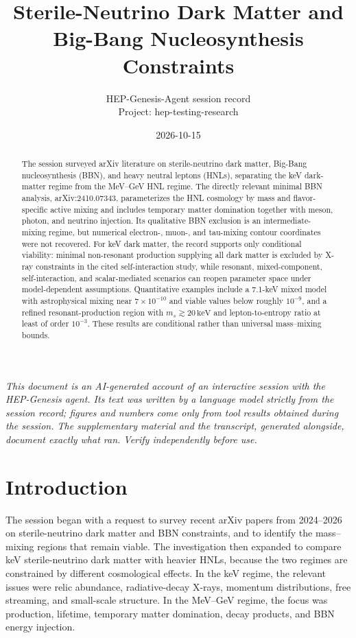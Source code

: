 \documentclass[11pt,a4paper]{article}
\title{Sterile-Neutrino Dark Matter and Big-Bang Nucleosynthesis Constraints}
\author{HEP-Genesis-Agent session record \\ \small Project: hep-testing-research}
\date{2026-10-15}
\begin{document}
\maketitle
\noindent\textit{\small This document is an AI-generated account of an interactive session with the HEP-Genesis agent. Its text was written by a language model strictly from the session record; figures and numbers come only from tool results obtained during the session. The supplementary material and the transcript, generated alongside, document exactly what ran. Verify independently before use.}
\vspace{1em}

\begin{abstract}
The session surveyed arXiv literature on sterile-neutrino dark matter, Big-Bang nucleosynthesis (BBN), and heavy neutral leptons (HNLs), separating the keV dark-matter regime from the MeV--GeV HNL regime. The directly relevant minimal BBN analysis, arXiv:2410.07343, parameterizes the HNL cosmology by mass and flavor-specific active mixing and includes temporary matter domination together with meson, photon, and neutrino injection. Its qualitative BBN exclusion is an intermediate-mixing regime, but numerical electron-, muon-, and tau-mixing contour coordinates were not recovered. For keV dark matter, the record supports only conditional viability: minimal non-resonant production supplying all dark matter is excluded by X-ray constraints in the cited self-interaction study, while resonant, mixed-component, self-interaction, and scalar-mediated scenarios can reopen parameter space under model-dependent assumptions. Quantitative examples include a 7.1-keV mixed model with astrophysical mixing near \(7\times10^{-10}\) and viable values below roughly \(10^{-9}\), and a refined resonant-production region with \(m_s\gtrsim20\,\mathrm{keV}\) and lepton-to-entropy ratio at least of order \(10^{-3}\). These results are conditional rather than universal mass--mixing bounds.
\end{abstract}

\section{Introduction}

The session began with a request to survey recent arXiv papers from 2024--2026 on sterile-neutrino dark matter and BBN constraints, and to identify the mass--mixing regions that remain viable. The investigation then expanded to compare keV sterile-neutrino dark matter with heavier HNLs, because the two regimes are constrained by different cosmological effects. In the keV regime, the relevant issues were relic abundance, radiative-decay X-rays, momentum distributions, free streaming, and small-scale structure. In the MeV--GeV regime, the focus was production, lifetime, temporary matter domination, decay products, and BBN energy injection.
\end{document}
